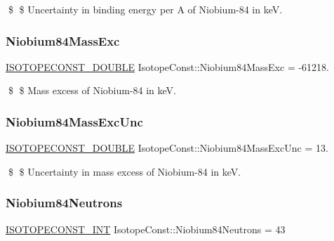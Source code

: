 \$ \$ Uncertainty in binding energy per A of Niobium-\/84 in keV. \mbox{\label{group___isotope_const-_niobium-_nb84_gab78a89df70b8cf8b7d3cb0ffb72dd246}} 
\subsubsection{\texorpdfstring{Niobium84\+Mass\+Exc}{Niobium84MassExc}}
{\footnotesize\ttfamily \mbox{\hyperlink{group___isotope_const-_macros_ga8f45a7272ce02c0b4c65c44636ed719a}{I\+S\+O\+T\+O\+P\+E\+C\+O\+N\+S\+T\+\_\+\+D\+O\+U\+B\+LE}} Isotope\+Const\+::\+Niobium84\+Mass\+Exc = -\/61218.}

\$ \$ Mass excess of Niobium-\/84 in keV. \mbox{\label{group___isotope_const-_niobium-_nb84_ga7fce6065a1eb9284cc8942deafefe46d}} 
\subsubsection{\texorpdfstring{Niobium84\+Mass\+Exc\+Unc}{Niobium84MassExcUnc}}
{\footnotesize\ttfamily \mbox{\hyperlink{group___isotope_const-_macros_ga8f45a7272ce02c0b4c65c44636ed719a}{I\+S\+O\+T\+O\+P\+E\+C\+O\+N\+S\+T\+\_\+\+D\+O\+U\+B\+LE}} Isotope\+Const\+::\+Niobium84\+Mass\+Exc\+Unc = 13.}

\$ \$ Uncertainty in mass excess of Niobium-\/84 in keV. \mbox{\label{group___isotope_const-_niobium-_nb84_ga41d7ceaadec465ee9bd137307ea0e9d6}} 
\subsubsection{\texorpdfstring{Niobium84\+Neutrons}{Niobium84Neutrons}}
{\footnotesize\ttfamily \mbox{\hyperlink{group___isotope_const-_macros_ga5f18360b3e99483a35c32d789e62621c}{I\+S\+O\+T\+O\+P\+E\+C\+O\+N\+S\+T\+\_\+\+I\+NT}} Isotope\+Const\+::\+Niobium84\+Neutrons = 43}

